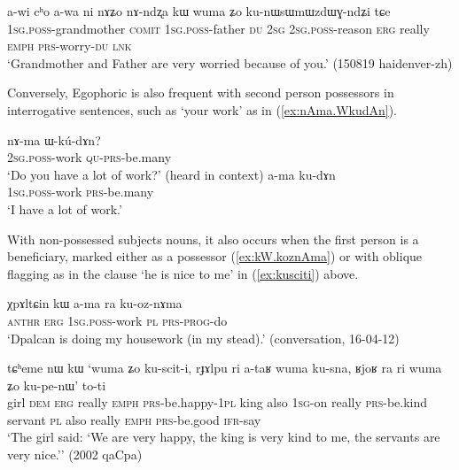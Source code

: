 \begin{exe}
\ex \label{ex:kunWsWmWzdWGndZi}
\gll a-wi cʰo a-wa ni nɤʑo nɤ-ndʐa kɯ wuma ʑo ku-nɯsɯmɯzdɯɣ-ndʑi tɕe \\
\textsc{1sg}.\textsc{poss}-grandmother \textsc{comit} \textsc{1sg}.\textsc{poss}-father \textsc{du} \textsc{2sg} \textsc{2sg}.\textsc{poss}-reason \textsc{erg} really \textsc{emph} \textsc{prs}-worry-\textsc{du} \textsc{lnk} \\
\glt `Grandmother and Father are very worried because of you.' (150819 haidenver-zh)
\end{exe}

Conversely, Egophoric is also frequent with second person possessors in interrogative sentences, such as  `your work' as in (\ref{ex:nAma.WkudAn}).

\begin{exe} 
	\ex 
	\begin{xlist}
		\ex \label{ex:nAma.WkudAn}
		\gll nɤ-ma ɯ-kú-dɤn? \\
		\textsc{2sg}.\textsc{poss}-work \textsc{qu}-\textsc{prs}-be.many \\
		\glt `Do you have a lot of work?' (heard in context)
		\ex \label{ex:ama.kudAn}
		\gll a-ma ku-dɤn \\
		\textsc{1sg}.\textsc{poss}-work \textsc{prs}-be.many \\
		\glt `I have a lot of work.' 
	\end{xlist}
\end{exe} 

With non-possessed subjects nouns, it also occurs when the first person is a beneficiary, marked either as a possessor (\ref{ex:kW.koznAma}) or with oblique flagging as in the clause  `he is nice to me' in (\ref{ex:kusciti}) above.

\begin{exe}
	\ex \label{ex:kW.koznAma}
	\gll χpɤltɕin kɯ a-ma ra ku-oz-nɤma \\
	\textsc{anthr} \textsc{erg} \textsc{1sg}.\textsc{poss}-work \textsc{pl} \textsc{prs}-\textsc{prog}-do \\
	\glt `Dpalcan is doing my housework (in my stead).' (conversation, 16-04-12)
\end{exe}

\begin{exe}
	\ex \label{ex:kusciti}
	\gll tɕʰeme nɯ kɯ `wuma ʑo ku-scit-i, rɟɤlpu ri a-taʁ wuma ku-sna, ʁjoʁ ra ri wuma ʑo ku-pe-nɯ' to-ti\\
	girl \textsc{dem} \textsc{erg} really \textsc{emph} \textsc{prs}-be.happy-\textsc{1pl}  king also \textsc{1sg}-on really \textsc{prs}-be.kind servant \textsc{pl} also really \textsc{emph}   \textsc{prs}-be.good \textsc{ifr}-say\\
	\glt `The girl said: `We are very happy, the king is very kind to me, the servants are very nice.'' (2002 qaCpa)
\end{exe}

